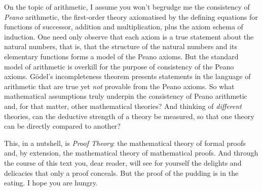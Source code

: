 
On the topic of arithmetic, I assume you won't begrudge me the consistency of \emph{Peano} arithmetic, the first-order theory axiomatised by the defining equations for functions of successor, addition and multiplication, plus the axiom schema of induction.
One need only observe that each axiom is a true statement about the natural numbers, that is, that the structure of the natural numbers and its elementary functions forms a model of the Peano axioms.
But the standard model of arithmetic is overkill for the purpose of consistency of the Peano axioms.
Gödel's incompleteness theorem presents statements in the language of arithmetic that are true yet \emph{not} provable from the Peano axioms.
So what mathematical assumptions truly underpin the consistency of Peano arithmetic and, for that matter, other mathematical theories?
And thinking of \emph{different} theories, 
can the deductive strength of a theory be measured, so that one theory can be directly compared to another?

This, in a nutshell, is
\emph{Proof Theory}: the mathematical theory of formal proofs and, by extension, the mathematical theory of mathematical proofs.
%
And through the course of this text you, dear reader, will see  for yourself the delights and delicacies that only a proof conceals.
%
But the proof of the pudding is in the eating.
%
I hope you are hungry.

